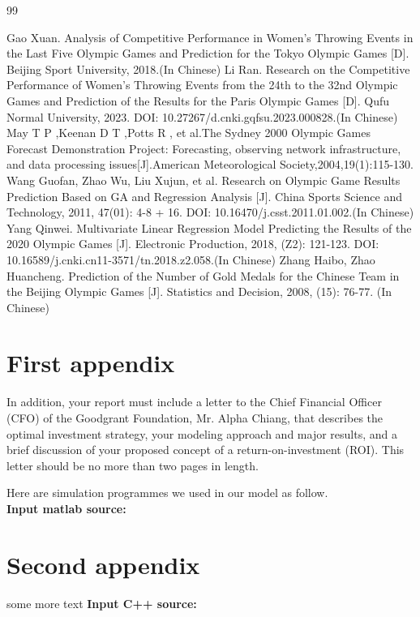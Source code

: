 \documentclass{mcmthesis}
\begin{document}
\begin{thebibliography}{99}

 Gao Xuan. Analysis of Competitive Performance in Women's Throwing Events in the Last Five Olympic Games and Prediction for the Tokyo Olympic Games [D]. Beijing Sport University, 2018.(In Chinese) 
 Li Ran. Research on the Competitive Performance of Women's Throwing Events from the 24th to the 32nd Olympic Games and Prediction of the Results for the Paris Olympic Games [D]. Qufu Normal University, 2023. DOI: 10.27267/d.cnki.gqfsu.2023.000828.(In Chinese) 
 May T P ,Keenan D T ,Potts R , et al.The Sydney 2000 Olympic Games Forecast Demonstration Project: Forecasting, observing network infrastructure, and data processing issues[J].American Meteorological Society,2004,19(1):115-130.
 Wang Guofan, Zhao Wu, Liu Xujun, et al. Research on Olympic Game Results Prediction Based on GA and Regression Analysis [J]. China Sports Science and Technology, 2011, 47(01): 4-8 + 16. DOI: 10.16470/j.csst.2011.01.002.(In Chinese) 
 Yang Qinwei. Multivariate Linear Regression Model Predicting the Results of the 2020 Olympic Games [J]. Electronic Production, 2018, (Z2): 121-123. DOI: 10.16589/j.cnki.cn11-3571/tn.2018.z2.058.(In Chinese)
 Zhang Haibo, Zhao Huancheng. Prediction of the Number of Gold Medals for the Chinese Team in the Beijing Olympic Games [J]. Statistics and Decision, 2008, (15): 76-77. (In Chinese)

\end{thebibliography}

\begin{appendices}

\section{First appendix}

In addition, your report must include a letter to the Chief Financial Officer (CFO) of the Goodgrant Foundation, Mr. Alpha Chiang, that describes the optimal investment strategy, your modeling approach and major results, and a brief discussion of your proposed concept of a return-on-investment (ROI). This letter should be no more than two pages in length.

Here are simulation programmes we used in our model as follow.\\

\textbf{\textcolor[rgb]{0.98,0.00,0.00}{Input matlab source:}}


\section{Second appendix}

some more text \textcolor[rgb]{0.98,0.00,0.00}{\textbf{Input C++ source:}}


\end{appendices}
\end{document}
